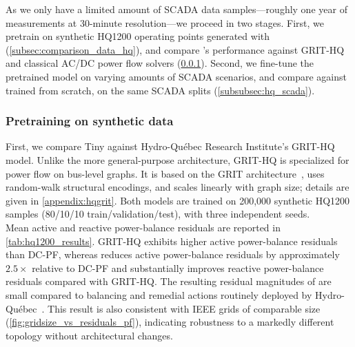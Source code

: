 As we only have a limited amount of SCADA data samples---roughly one year of measurements at 30-minute resolution---we proceed in two stages.
First, we pretrain \genco on synthetic HQ1200 operating points generated with \datakit (\cref{subsec:comparison_data_hq}), and compare \genco's performance against GRIT-HQ and classical AC/DC power flow solvers (\cref{subsubsec:hq_synthetic}).
Second, we fine-tune the pretrained \genco model on varying amounts of SCADA scenarios, and compare against \genco trained from scratch, on the same SCADA splits (\cref{subsubsec:hq_scada}).

\subsubsection{Pretraining on synthetic data}
\label{subsubsec:hq_synthetic}

First, we compare \genco Tiny against Hydro-Qu\'ebec Research Institute's GRIT-HQ model. Unlike the more general-purpose \genco architecture, GRIT-HQ is specialized for power flow on bus-level graphs. It is based on the GRIT architecture~\cite{ma2023graph}, uses random-walk structural encodings, and scales linearly with graph size; details are given in \cref{appendix:hqgrit}. Both models are trained on 200{,}000 synthetic HQ1200 samples (80/10/10 train/validation/test), with three independent seeds.\\

Mean active and reactive power-balance residuals are reported in \cref{tab:hq1200_results}. GRIT-HQ exhibits higher active power-balance residuals than DC-PF, whereas \genco reduces active power-balance residuals by approximately $2.5\times$ relative to DC-PF and substantially improves reactive power-balance residuals compared with GRIT-HQ. The resulting residual magnitudes of \genco are small compared to balancing and remedial actions routinely deployed by Hydro-Québec~\cite{EU2017_2195,EU2017_1485_SOGL}. This result is also consistent with IEEE grids of comparable size (\cref{fig:gridsize_vs_residuals_pf}), indicating robustness to a markedly different topology without architectural changes.

